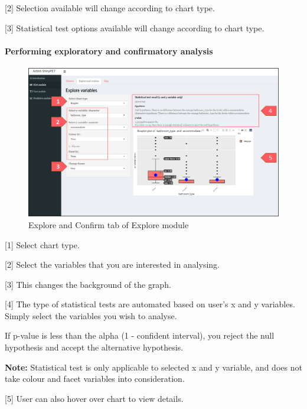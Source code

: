\documentclass[
  12pt,
]{article}
\begin{document}
{[}2{]} Selection available will change according to chart type.

{[}3{]} Statistical test options available will change according to
chart type.

\hypertarget{performing-exploratory-and-confirmatory-analysis}{%
\paragraph{Performing exploratory and confirmatory
analysis}\label{performing-exploratory-and-confirmatory-analysis}}

\begin{figure}[H]

{\centering \includegraphics[width=1\linewidth]{images/explore1} 

}

\caption{Explore and Confirm tab of Explore module}\label{fig:unnamed-chunk-5}
\end{figure}

{[}1{]} Select chart type.

{[}2{]} Select the variables that you are interested in analysing.

{[}3{]} This changes the background of the graph.

{[}4{]} The type of statistical tests are automated based on user's x
and y variables. Simply select the variables you wish to analyse.

If p-value is less than the alpha (1 - confident interval), you reject
the null hypothesis and accept the alternative hypothesis.

\textbf{Note:} Statistical test is only applicable to selected x and y
variable, and does not take colour and facet variables into
consideration.

{[}5{]} User can also hover over chart to view details.
\end{document}
